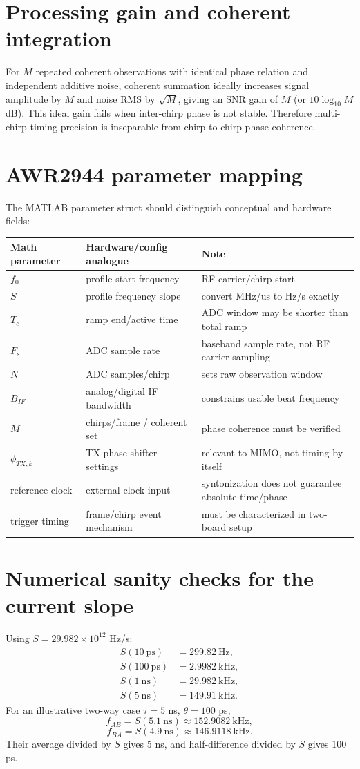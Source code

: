 \documentclass[11pt]{article}
\begin{document}
\section{Processing gain and coherent integration}
For $M$ repeated coherent observations with identical phase relation and independent additive noise, coherent summation ideally increases signal amplitude by $M$ and noise RMS by $\sqrt{M}$, giving an SNR gain of $M$ (or $10\log_{10}M$ dB). This ideal gain fails when inter-chirp phase is not stable. Therefore multi-chirp timing precision is inseparable from chirp-to-chirp phase coherence.

\section{AWR2944 parameter mapping}
The MATLAB parameter struct should distinguish conceptual and hardware fields:
\begin{longtable}{p{}p{}p{}}
\toprule Math parameter & Hardware/config analogue & Note \\ \midrule
$f_0$ & profile start frequency & RF carrier/chirp start \\
$S$ & profile frequency slope & convert MHz/us to Hz/s exactly \\
$T_c$ & ramp end/active time & ADC window may be shorter than total ramp \\
$F_s$ & ADC sample rate & baseband sample rate, not RF carrier sampling \\
$N$ & ADC samples/chirp & sets raw observation window \\
$B_{IF}$ & analog/digital IF bandwidth & constrains usable beat frequency \\
$M$ & chirps/frame / coherent set & phase coherence must be verified \\
$\phi_{TX,k}$ & TX phase shifter settings & relevant to MIMO, not timing by itself \\
reference clock & external clock input & syntonization does not guarantee absolute time/phase \\
trigger timing & frame/chirp event mechanism & must be characterized in two-board setup \\
\bottomrule
\end{longtable}

\section{Numerical sanity checks for the current slope}
Using $S=29.982\times10^{12}$ Hz/s:
\begin{align*}
S(10\ \mathrm{ps})&=299.82\ \mathrm{Hz},\\
S(100\ \mathrm{ps})&=2.9982\ \mathrm{kHz},\\
S(1\ \mathrm{ns})&=29.982\ \mathrm{kHz},\\
S(5\ \mathrm{ns})&=149.91\ \mathrm{kHz}.
\end{align*}
For an illustrative two-way case $\tau=5$ ns, $\theta=100$ ps,
\[
f_{AB}=S(5.1\ \mathrm{ns})\approx152.9082\ \mathrm{kHz},
\]
\[
f_{BA}=S(4.9\ \mathrm{ns})\approx146.9118\ \mathrm{kHz}.
\]
Their average divided by $S$ gives 5 ns, and half-difference divided by $S$ gives 100 ps.
\end{document}
